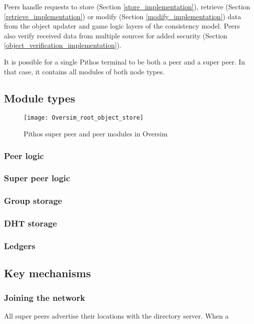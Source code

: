 Peers handle requests to store (Section \ref{store_implementation}), retrieve (Section \ref{retrieve_implementation}) or modify (Section \ref{modify_implementation}) data from the object updater and game logic layers of the consistency model. Peers also verify received data from multiple sources for added security (Section \ref{object_verification_implementation}).

It is possible for a single Pithos terminal to be both a peer and a super peer. In that case, it contains all modules of both node types.

\subsection{Module types}
\label{pithos_module_types}

\begin{figure}[htbp]
 \centering
 \texttt{[image: Oversim\_root\_object\_store]}
 \caption{Pithos super peer and peer modules in Oversim}
 \label{fig_oversim_root_object_store}
\end{figure}

\subsubsection{Peer logic}

\subsubsection{Super peer logic}

\subsubsection{Group storage}

\subsubsection{DHT storage}

\subsubsection{Ledgers}

\subsection{Key mechanisms}
    \subsubsection{Joining the network}
    \label{network_join_implementation}
    All super peers advertise their locations with the directory server. When a

